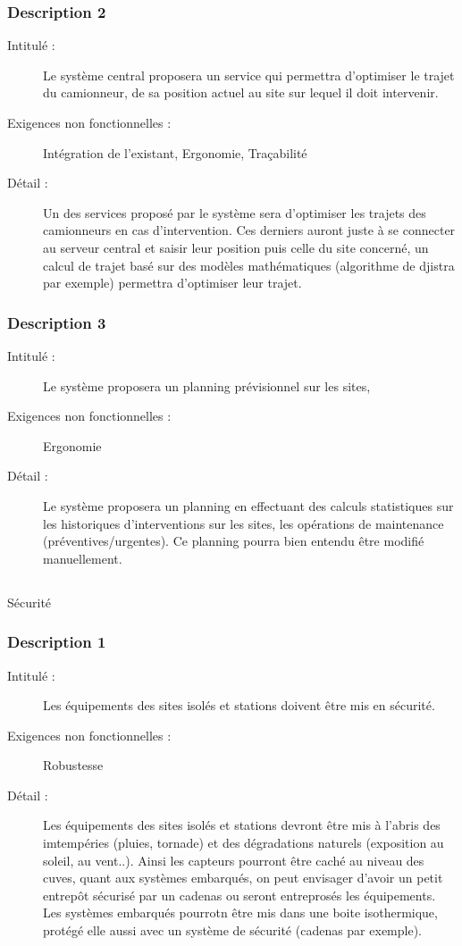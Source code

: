  \subsubsection {Description 2}
\begin{description}
           \item[Intitulé :] Le système central proposera un service qui permettra d'optimiser le trajet du camionneur, de sa position
actuel au site sur lequel il doit intervenir.
           \item[Exigences non fonctionnelles :] Intégration de l'existant, Ergonomie, Traçabilité
           \item[Détail :] Un des services proposé par le système sera d'optimiser les trajets des camionneurs en cas d'intervention.
Ces derniers auront juste à se connecter au serveur central et saisir leur position puis celle du site concerné,
un calcul de trajet basé sur des modèles mathématiques (algorithme de djistra par exemple) permettra d'optimiser 
leur trajet.
\end{description}

 \subsubsection {Description 3}
\begin{description}
           \item[Intitulé :] Le système proposera un planning prévisionnel sur les sites,
           \item[Exigences non fonctionnelles :] Ergonomie
           \item[Détail :] Le système proposera un planning en effectuant des calculs statistiques sur les historiques d'interventions sur les sites, 
les opérations de maintenance (préventives/urgentes). Ce planning pourra bien entendu être modifié manuellement.
\end{description}


\subsection {}Sécurité
 \subsubsection {Description 1}
\begin{description}
           \item[Intitulé :] Les équipements des sites isolés et stations doivent être mis en sécurité.
           \item[Exigences non fonctionnelles :] Robustesse
           \item[Détail :] Les équipements des sites isolés et stations devront être mis à l'abris des imtempéries (pluies, tornade) 
et des dégradations naturels (exposition au soleil, au vent..). Ainsi les capteurs pourront être caché au niveau 
des cuves, quant aux systèmes embarqués, on peut envisager d'avoir un petit entrepôt sécurisé par un cadenas ou 
seront entreprosés les équipements. Les systèmes embarqués pourrotn être mis dans une boite isothermique, 
protégé elle aussi avec un système de sécurité (cadenas par exemple).
\end{description}

